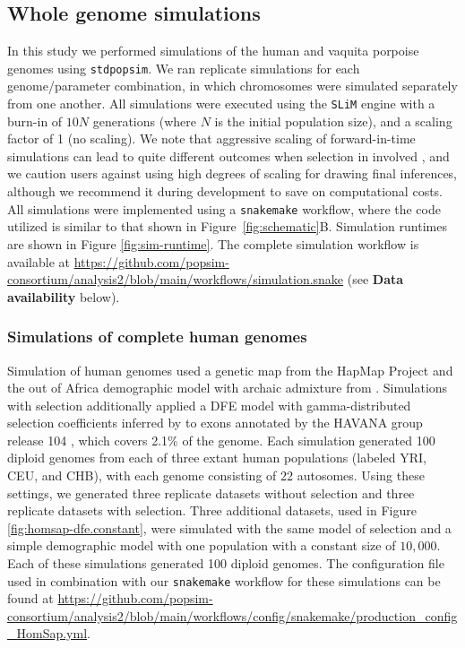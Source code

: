 \documentclass[hidelinks]{article}
\newcommand{\stdpopsim}{\texttt{stdpopsim}\xspace}
\newcommand{\slim}{\texttt{SLiM}\xspace}
\newcommand{\snakemake}{\texttt{snakemake}\xspace}
\begin{document}
    \subsection*{Whole genome simulations}
    In this study we performed simulations of the human and vaquita porpoise genomes
    using \stdpopsim{}. We ran replicate simulations for each genome/parameter combination,
    in which chromosomes were simulated separately from one another.
    All simulations were executed using the \slim engine with a burn-in of $10N$ generations
    (where $N$ is the initial population size), and a scaling factor of 1 (no scaling).
    We note that aggressive scaling of forward-in-time simulations
    can lead to quite different outcomes when selection in involved
    \cite{uricchio2014robust,ferrari2024towards, dabi2025population},
    and we caution users against using high degrees of scaling for drawing
    final inferences, although we recommend it during development to save
    on computational costs. 
    All simulations were implemented using a \snakemake workflow,
    where the code utilized is similar to that shown in Figure~\ref{fig:schematic}B.
    Simulation runtimes are shown in Figure \ref{fig:sim-runtime}. 
    The complete simulation workflow is available at \url{https://github.com/popsim-consortium/analysis2/blob/main/workflows/simulation.snake}
    (see \textbf{Data availability} below).


    \subsubsection*{Simulations of complete human genomes}
    Simulation of human genomes used a genetic map from the HapMap Project
    \citep[\stdpopsim label \texttt{HapMapII\_GRCh38}]{international2007second} and
    the out of Africa demographic model with archaic admixture from
    \citet[\stdpopsim label \texttt{OutOfAfricaArchaicAdmixture\_5R19}]{ragsdale2019models}.
    Simulations with selection additionally applied a DFE model with gamma-distributed selection coefficients inferred by
    \citet[\stdpopsim label \texttt{Gamma\_K17}]{kim2017inference} to exons annotated by the HAVANA group release 104
    \citep[\stdpopsim label \texttt{ensembl\_havana\_104\_exons}]{ensembl2018},
    which covers 2.1\% of the genome. 
    Each simulation generated 100 diploid genomes from each of three extant human populations (labeled YRI, CEU, and CHB),
    with each genome consisting of 22 autosomes.
    Using these settings, we generated three replicate datasets without selection
    and three replicate datasets with selection.
    Three additional datasets, used in Figure \ref{fig:homsap-dfe.constant},
    were simulated with the same model of selection and a simple demographic model with one population with a constant size of $10,000$.
    Each of these simulations generated 100 diploid genomes.
    The configuration file used in combination with our \snakemake workflow
    for these simulations can be found at \url{https://github.com/popsim-consortium/analysis2/blob/main/workflows/config/snakemake/production_config_HomSap.yml}.
\end{document}
